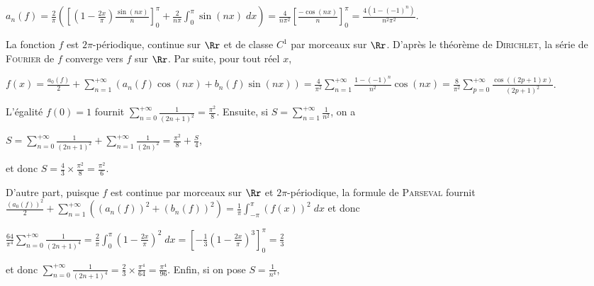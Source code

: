 {{\begin{center}
$a_n(f)=\frac{2}{\pi}\left(\left[\left(1-\frac{2x}{\pi}\right)\frac{\sin(nx)}{n}\right]_0^\pi+\frac{2}{n\pi}\int_{0}^{\pi}\sin(nx)\;dx\right)=\frac{4}{n\pi^2}\left[\frac{-\cos(nx)}{n}\right]_0^\pi=\frac{4(1-(-1)^n)}{n^2\pi^2}$.
\end{center} 

La fonction $f$ est $2\pi$-périodique, continue sur $\Rr$ et de classe $C^1$ par morceaux sur $\Rr$. D'après le théorème de \textsc{Dirichlet}, la série de \textsc{Fourier} de $f$ converge vers $f$ sur $\Rr$. Par suite, pour tout réel $x$, 

\begin{center}
$f(x)=\frac{a_0(f)}{2}+\sum_{n=1}^{+\infty}(a_n(f)\cos(nx)+b_n(f)\sin(nx))=\frac{4}{\pi^2}\sum_{n=1}^{+\infty}\frac{1-(-1)^n}{n^2}\cos(nx)=\frac{8}{\pi^2}\sum_{p=0}^{+\infty}\frac{\cos((2p+1)x)}{(2p+1)^2}$.
\end{center}

\begin{center}
\end{center}

L'égalité $f(0)=1$ fournit $\sum_{n=0}^{+\infty}\frac{1}{(2n+1)^2}=\frac{\pi^2}{8}$. Ensuite, si $S=\sum_{n=1}^{+\infty}\frac{1}{n^2}$, on a

\begin{center}
$S=\sum_{n=0}^{+\infty}\frac{1}{(2n+1)^2}+\sum_{n=1}^{+\infty}\frac{1}{(2n)^2}=\frac{\pi^2}{8}+\frac{S}{4}$,
\end{center}

et donc $S=\frac{4}{3}\times\frac{\pi^2}{8}=\frac{\pi^2}{6}$.

D'autre part, puisque $f$ est continue par morceaux sur $\Rr$ et $2\pi$-périodique, la formule de \textsc{Parseval} fournit $\frac{(a_0(f))^2}{2}+\sum_{n=1}^{+\infty}((a_n(f))^2+(b_n(f))^2)=\frac{1}{\pi}\int_{-\pi}^{\pi}(f(x))^2\;dx$ et donc

\begin{center}
$\frac{64}{\pi^4}\sum_{n=0}^{+\infty}\frac{1}{(2n+1)^4}=\frac{2}{\pi}\int_{0}^{\pi}\left(1-\frac{2x}{\pi}\right)^2\;dx=\left[-\frac{1}{3}\left(1-\frac{2x}{\pi}\right)^3\right]_0^\pi=\frac{2}{3}$
\end{center}

et donc $\sum_{n=0}^{+\infty}\frac{1}{(2n+1)^4}=\frac{2}{3}\times\frac{\pi^4}{64}=\frac{\pi^4}{96}$. Enfin, si on pose $S=\frac{1}{n^4}$,

}}

